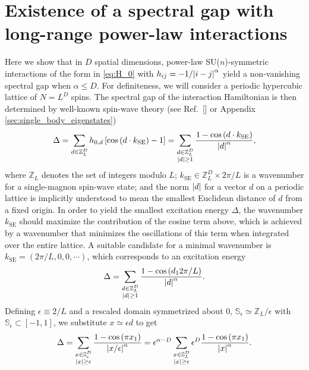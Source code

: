 \documentclass[nofootinbib,notitlepage,11pt]{revtex4-2}
\renewcommand{\t}{\text} %
\newcommand{\f}[2]{\dfrac{#1}{#2}} %
\newcommand{\p}[1]{\left(#1\right)} %
\renewcommand{\sp}[1]{\left[#1\right]} %
\renewcommand{\c}{\cdot} %
\newcommand{\1}{\mathds{1}}
\renewcommand{\SS}{\mathbb{S}}
\newcommand{\ZZ}{\mathbb{Z}}
\begin{document}
\section{Existence of a spectral gap with long-range power-law
  interactions}
\label{sec:spectral_gap}

Here we show that in $D$ spatial dimensions, power-law
SU($n$)-symmetric interactions of the form in \eqref{eq:H_0} with
$h_{ij}=-1/\abs{i-j}^\alpha$ yield a non-vanishing spectral gap when
$\alpha\le D$.  For definiteness, we will consider a periodic
hypercubic lattice of $N=L^D$ spins.  The spectral gap of the
interaction Hamiltonian is then determined by well-known spin-wave
theory (see Ref.~[] or Appendix
\ref{sec:single_body_eigenstates})
\begin{align}
  \Delta
  = \sum_{d\in\ZZ_L^D} h_{0,d} \sp{\cos\p{d \c k_{\t{SE}}}-1}
  = \sum_{\substack{d\in\ZZ_L^D\\\abs{d}\ge1}}
  \f{1-\cos\p{d \c k_{\t{SE}}}}{\abs{d}^\alpha},
\end{align}
where $\ZZ_L$ denotes the set of integers modulo $L$;
$k_{\t{SE}}\in\ZZ_L^D\times2\pi/L$ is a wavenumber for a single-magnon
spin-wave state; and the norm $\abs{d}$ for a vector $d$ on a periodic
lattice is implicitly understood to mean the smallest Euclidean
distance of $d$ from a fixed origin.  In order to yield the smallest
excitation energy $\Delta$, the wavenumber $k_{\t{SE}}$ should
maximize the contribution of the cosine term above, which is achieved
by a wavenumber that minimizes the oscillations of this term when
integrated over the entire lattice.  A suitable candidate for a
minimal wavenumber is $k_{\t{SE}}=\p{2\pi/L,0,0,\cdots}$, which
corresponds to an excitation energy
\begin{align}
  \Delta = \sum_{\substack{d\in\ZZ_L^D\\\abs{d}\ge1}}
  \f{1-\cos\p{d_12\pi/L}}{\abs{d}^\alpha}.
\end{align}
Defining $\epsilon\equiv2/L$ and a rescaled domain symmetrized about
$0$, $\SS_\epsilon\simeq\ZZ_L/\epsilon$ with
$\SS_\epsilon\subset\sp{-1,1}$, we substitute $x\simeq\epsilon d$ to
get
\begin{align}
  \Delta
  = \sum_{\substack{x\in\SS_\epsilon^D\\\abs{x}\ge\epsilon}}
  \f{1-\cos\p{\pi x_1}}{\abs{x/\epsilon}^\alpha}
  = \epsilon^{\alpha-D} \sum_{\substack{x\in\SS_L^D\\\abs{x}\ge\epsilon}}
  \epsilon^D \f{1-\cos\p{\pi x_1}}{\abs{x}^\alpha}.
\end{align}
\end{document}
